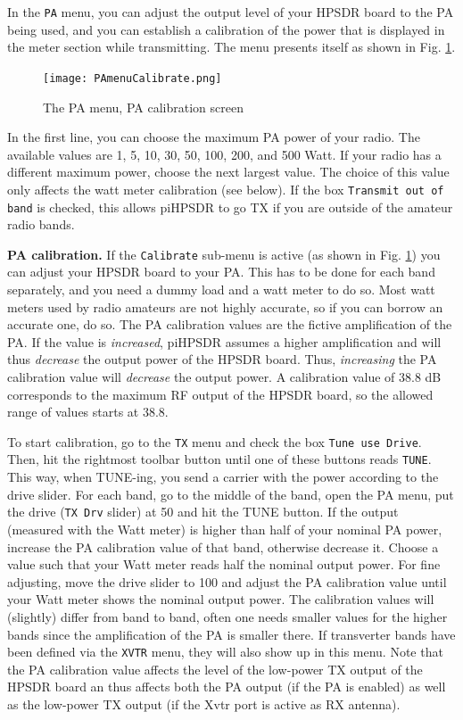 \documentclass[12pt]{book}
\def\rett#1{\texttt{\color{red}#1}}
\def\bltt#1{\texttt{\color{blue}#1}}
\def\pH{pi\-HPSDR\xspace}
\begin{document}
In the \bltt{PA} menu, you can adjust the output level of your HPSDR board
to the PA being used, and you can establish a calibration of the
power that is displayed in the meter section while transmitting.
The menu presents itself as shown in Fig. \ref{fig:PAMenuCalibrate}.

\begin{figure}[ht]
\center
\texttt{[image: PAmenuCalibrate.png]}
\caption{The PA menu, PA calibration screen}
\label{fig:PAMenuCalibrate}
\end{figure}

In the first line, you can choose the maximum PA power of your
radio. The available values are 1, 5, 10, 30, 50, 100, 200, and
500 Watt. If your radio has a different maximum power, choose the
next largest value. The choice of this value only affects the
watt meter calibration (see below). If the  box
\rett{Transmit out of band} is checked, this allows \pH
to go TX if you are outside of the amateur radio bands.



\textbf{PA calibration.} If the \rett{Calibrate} sub-menu is active
(as shown in Fig. \ref{fig:PAMenuCalibrate}) you can adjust your
HPSDR board to your PA. This has to be done for each band separately,
and you need a dummy load and a watt meter to do so. Most watt meters
used by radio amateurs are not highly accurate, so if you can borrow
an accurate one, do so. The PA calibration values are the fictive
amplification of the PA. If the value is \textit{increased},
\pH assumes a higher amplification and will thus \textit{decrease}
the output power of the HPSDR board. Thus, \textit{increasing} the
PA calibration value will \textit{decrease} the output power. A calibration
value of 38.8 dB corresponds to the maximum RF output of the HPSDR board,
so the allowed range of values starts at 38.8.

To start calibration, go to the \bltt{TX} menu and check the
box \rett{Tune use Drive}. Then, hit the rightmost toolbar button
until one of these buttons reads \bltt{TUNE}. This way, when
TUNE-ing, you send a carrier with the power according to the drive
slider. For each band, go to the middle of the band, open the PA
menu, put the drive (\rett{TX Drv} slider) at 50 and hit the TUNE button. If the
output (measured with the Watt meter) is higher than half
of your nominal PA power, increase the
PA calibration value of that band, otherwise decrease it. Choose
a value such that your Watt meter reads half the nominal output
power. For fine adjusting, move the drive slider to 100 and
adjust the PA calibration value until your Watt meter shows the
nominal output  power. The calibration values will  (slightly)
differ from band to band, often one needs smaller values for the
higher bands since the amplification of the PA is smaller there.
If transverter bands have been defined via the \bltt{XVTR} menu,
they will also show up in this menu. Note that the PA calibration
value affects the level of the low-power TX output of the HPSDR board
an thus affects both the PA output (if the PA is enabled) as well
as the low-power TX output (if the Xvtr port is active as RX antenna).
\end{document}
